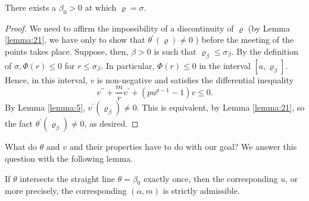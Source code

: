 \begin{lemma}\label{lemma:23}
  There exists a $\beta_0>0$ at which $\varrho=\sigma$.
\end{lemma}

\begin{proof}
  We need to affirm the impossibility of a discontinuity of $\varrho$ (by Lemma \ref{lemma:21},
  we have only to show that $\theta^{\prime}(\varrho) \neq 0$ ) before the meeting
  of the points takes place. Suppose, then, $\beta>0$ is such that
  $\varrho_\beta \leq \sigma_\beta$.
  By the definition of $\sigma, \Phi(r) \leq 0$ for $r \leq \sigma_\beta$.
  In particular, $\Phi(r) \leq 0$ in the interval $\left[a, \varrho_\beta\right]$.
  Hence, in this interval, $v$ is non-negative and satisfies the differential inequality
  \begin{equation}\label{eq:4.14}
    v^{\prime \prime}+\frac{m}{r} v^{\prime}+\left(p u^{p-1}-1\right) v \leq 0.
  \end{equation}
  By Lemma \ref{lemma:5}, $v^{\prime}\left(\varrho_\beta\right) \neq 0$. This is equivalent,
  by Lemma \ref{lemma:21}, so the fact $\theta^{\prime}\left(\varrho_\beta\right) \neq 0$, as desired.
\end{proof}

What do $\theta$ and $v$ and their properties have to do with our goal?
We answer this question with the following lemma.

\begin{lemma}\label{lemma:24}
  If $\theta$ intersects the straight line $\theta=\beta_0$ exactly once,
  then the corresponding $u$, or more precisely, the corresponding $(\alpha, m)$
  is strictly admissible.
\end{lemma}

